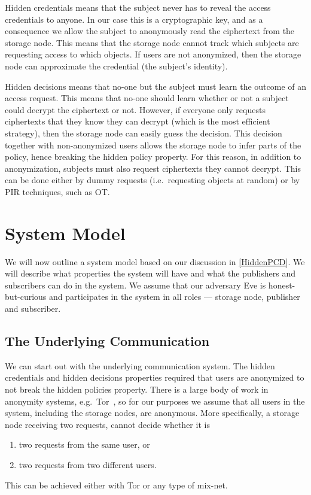 Hidden credentials means that the subject never has to reveal the access 
credentials to anyone.
In our case this is a cryptographic key, and as a consequence we allow the 
subject to anonymously read the ciphertext from the storage node.
This means that the storage node cannot track which subjects are requesting 
access to which objects.
If users are not anonymized, then the storage node can approximate the 
credential (the subject's identity).

Hidden decisions means that no-one but the subject must learn the outcome of an 
access request.
This means that no-one should learn whether or not a subject could decrypt the 
ciphertext or not.
However, if everyone only requests ciphertexts that they know they can decrypt 
(which is the most efficient strategy), then the storage node can easily guess 
the decision.
This decision together with non-anonymized users allows the storage node to 
infer parts of the policy, hence breaking the hidden policy property.
For this reason, in addition to anonymization, subjects must also request 
ciphertexts they cannot decrypt.
This can be done either by dummy requests (i.e.\ requesting objects at random) 
or by \ac{PIR} techniques, such as \ac{OT}.


\section{System Model}\label{SystemModel}

We will now outline a system model based on our discussion in \cref{HiddenPCD}.
We will describe what properties the system will have and what the publishers 
and subscribers can do in the system.
We assume that our adversary Eve is honest-but-curious and participates in the 
system in all roles --- storage node, publisher and subscriber.

\subsection{The Underlying Communication}\label{UnderlyingCommunication}

We can start out with the underlying communication system.
The hidden credentials and hidden decisions properties required that users are 
anonymized to not break the hidden policies property.
There is a large body of work in anonymity systems, e.g.\ Tor~\cite{Tor}, so 
for our purposes we assume that all users in the system, including the storage 
nodes, are anonymous.
More specifically, a storage node receiving two requests, cannot decide whether 
it is
\begin{enumerate}
\item two requests from the same user, or
\item two requests from two different users.
\end{enumerate}
This can be achieved either with Tor or any type of mix-net.


